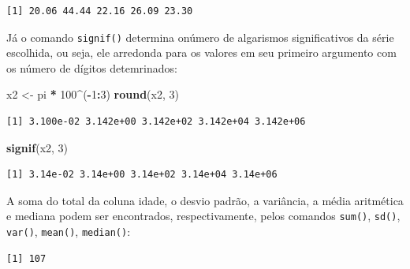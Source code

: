 \documentclass[12pt,brazil,oneside]{book}
\newenvironment{Shaded}{\begin{snugshade}}{\end{snugshade}}
\newcommand{\CommentTok}[1]{\textcolor[rgb]{0.56,0.35,0.01}{\textit{#1}}}
\newcommand{\DecValTok}[1]{\textcolor[rgb]{0.00,0.00,0.81}{#1}}
\newcommand{\KeywordTok}[1]{\textcolor[rgb]{0.13,0.29,0.53}{\textbf{#1}}}
\newcommand{\NormalTok}[1]{#1}
\newcommand{\OperatorTok}[1]{\textcolor[rgb]{0.81,0.36,0.00}{\textbf{#1}}}
\newcommand{\StringTok}[1]{\textcolor[rgb]{0.31,0.60,0.02}{#1}}
\begin{document}
\begin{verbatim}
[1] 20.06 44.44 22.16 26.09 23.30
\end{verbatim}

Já o comando \texttt{signif()} determina onúmero de algarismos
significativos da série escolhida, ou seja, ele arredonda para os
valores em seu primeiro argumento com os número de dígitos detemrinados:

\begin{Shaded}
\begin{Highlighting}[]
\NormalTok{x2 <-}\StringTok{ }\NormalTok{pi }\OperatorTok{*}\StringTok{ }\DecValTok{100}\OperatorTok{^}\NormalTok{(}\OperatorTok{-}\DecValTok{1}\OperatorTok{:}\DecValTok{3}\NormalTok{)}
\KeywordTok{round}\NormalTok{(x2, }\DecValTok{3}\NormalTok{)}
\end{Highlighting}
\end{Shaded}

\begin{verbatim}
[1] 3.100e-02 3.142e+00 3.142e+02 3.142e+04 3.142e+06
\end{verbatim}

\begin{Shaded}
\begin{Highlighting}[]
\KeywordTok{signif}\NormalTok{(x2, }\DecValTok{3}\NormalTok{) }
\end{Highlighting}
\end{Shaded}

\begin{verbatim}
[1] 3.14e-02 3.14e+00 3.14e+02 3.14e+04 3.14e+06
\end{verbatim}

A soma do total da coluna idade, o desvio padrão, a variância, a média
aritmética e mediana podem ser encontrados, respectivamente, pelos
comandos \texttt{sum()}, \texttt{sd()}, \texttt{var()}, \texttt{mean()},
\texttt{median()}:

\begin{Shaded}
\end{Shaded}

\begin{verbatim}
[1] 107
\end{verbatim}

\begin{Shaded}
\end{Shaded}
\end{document}
